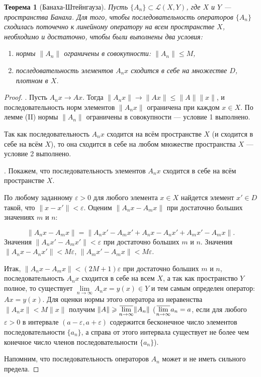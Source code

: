 \documentclass[12pt,a4paper,titlepage,oneside]{book}
\newcommand{\overbar}[1]{\mkern 1.5mu\overline{\mkern-1.5mu#1\mkern-1.5mu}\mkern 1.5mu}
\theoremstyle{definition}
\theoremstyle{plain}
\newtheorem*{theorem}{Теорема}
\theoremstyle{break}
\theoremstyle{remark}
\theoremstyle{remark}
\theoremstyle{remark}
\theoremstyle{remark}
\theoremstyle{plain}
\theoremstyle{plain}
\begin{document}
\begin{theorem}[Банаха-Штейнгауза]
Пусть $\lbrace A_n\rbrace \subset \mathcal{L}(X,Y)$, где $X$ и $Y$ --- пространства Банаха. Для того, чтобы последовательность операторов $\lbrace A_n\rbrace$ сходилась поточечно к линейному оператору на всем пространстве $X$, необходимо и достаточно, чтобы были выполнены два условия:

\begin{enumerate}
\item нормы $\lVert A_n\rVert$ ограничены в совокупности: $\lVert A_n\rVert \leqslant M$,
\item последовательность элементов $A_n x$ сходится в себе на множестве $D$, плотном в $X$.
\end{enumerate}
\end{theorem}

\begin{proof}
. Пусть $A_n x \to A x$. Тогда $\lVert A_n x\rVert \to \lVert A x\rVert \leqslant \lVert A\rVert \lVert x\rVert$, и последовательность норм элементов $\lVert A_n x\rVert$ ограничена при каждом $x \in X$. По лемме (II) нормы $\lVert A_n\rVert$ ограничены в совокупности --- условие 1 выполнено.

Так как последовательность $A_n x$ сходится на всём пространстве $X$ (и сходится в себе на всём $X$), то она сходится в себе на любом множестве пространства $X$ --- условие 2 выполнено.

. Покажем, что последовательность элементов $A_n x$ сходится в себе на всём пространстве $X$.

По любому заданному $\varepsilon > 0$ для любого элемента $x \in X$ найдется элемент $x' \in D$ такой, что $\lVert x - x'\rVert < \varepsilon$. Оценим $\lVert A_n x - A_m x\rVert$ при достаточно больших значениях $m$ и $n$:

$$\lVert A_n x - A_m x\rVert = \lVert A_n x' - A_m x' + A_n x - A_n x' + A_m x' - A_m x\rVert.$$
Значения $\lVert A_n x' - A_m x'\rVert < \varepsilon$ при достаточно больших $m$ и $n$.
Значения $\lVert A_n x - A_n x'\rVert < M\varepsilon$, $\lVert A_m x' - A_m x\rVert < M\varepsilon$.

Итак, $\lVert A_n x - A_m x\rVert < (2M +1)\varepsilon$ при достаточно больших $m$ и $n$, последовательность $A_n x$ сходится в себе на всем $X$, а так как пространство $Y$ полное, то существует $\lim\limits_{n \to \infty} A_n x = y(x) \in Y$ и тем самым определен оператор: $A x = y(x)$. Для оценки нормы этого оператора из неравенства $\lVert A_n x\rVert < M\lVert x\rVert$ получим $\lVert A\rVert \geqslant \overbar{\lim\limits_{n \to \infty}}\lVert A_n\rVert$ ($\overbar{\lim\limits_{n \to \infty}}a_n = a$, если для любого $\varepsilon > 0$ в интервале $(a-\varepsilon, a+\varepsilon)$ содержится бесконечное число элементов последовательности $\lbrace a_n\rbrace$, а справа от этого интервала существует не более чем конечное число членов последовательности $\lbrace a_n\rbrace$).

Напомним, что последовательность операторов $A_n$ может и не иметь сильного предела.
\end{proof}
\end{document}
